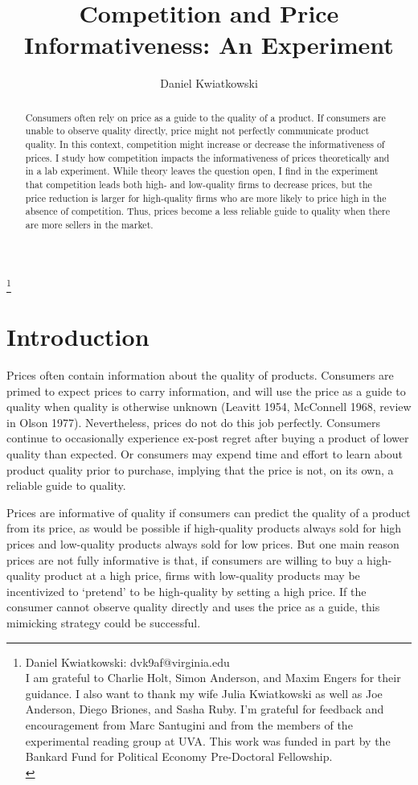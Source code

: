 \documentclass[12pt]{article}
\title{\vspace{-2ex} \Large Competition and Price Informativeness: An Experiment \vspace{-2ex}}
\author{Daniel Kwiatkowski}
\makeatletter
\newcommand{\acknowledgments}{%
    \begingroup
    \renewcommand\thefootnote{}\footnote{
    Daniel Kwiatkowski: dvk9af@virginia.edu \\
    I am grateful to Charlie Holt, Simon Anderson, and Maxim Engers for their guidance. I also want to thank my wife Julia Kwiatkowski as well as Joe Anderson, Diego Briones, and Sasha Ruby. I'm grateful for feedback and encouragement from Marc Santugini and from the members of the experimental reading group at UVA.  This work was funded in part by the Bankard Fund for Political Economy Pre-Doctoral Fellowship. \\}
    \addtocounter{footnote}{-1}
    \endgroup
}
\makeatother
\begin{document}


\maketitle

\begin{abstract}
Consumers often rely on price as a guide to the quality of a product. If consumers are unable to observe quality directly, price might not perfectly communicate product quality. In this context, competition might increase or decrease the informativeness of prices. I study how competition impacts the informativeness of prices theoretically and in a lab experiment. While theory leaves the question open, I find in the experiment that competition leads both high- and low-quality firms to decrease prices, but the price reduction is larger for high-quality firms who are more likely to price high in the absence of competition. Thus, prices become a less reliable guide to quality when there are more sellers in the market.
\end{abstract}

\acknowledgments




\newpage
\section{Introduction}

Prices often contain information about the quality of products. Consumers are primed to expect prices to carry information, and will use the price as a guide to quality when quality is otherwise unknown (Leavitt 1954, McConnell 1968, review in Olson 1977). Nevertheless, prices do not do this job perfectly. Consumers continue to occasionally experience ex-post regret after buying a product of lower quality than expected. Or consumers may expend time and effort to learn about product quality prior to purchase, implying that the price is not, on its own, a reliable guide to quality.

Prices are informative of quality if consumers can predict the quality of a product from its price, as would be possible if high-quality products always sold for high prices and low-quality products always sold for low prices. But one main reason prices are not fully informative is that, if consumers are willing to buy a high-quality product at a high price, firms with low-quality products may be incentivized to `pretend' to be high-quality by setting a high price. If the consumer cannot observe quality directly and uses the price as a guide, this mimicking strategy could be successful. 
\end{document}
